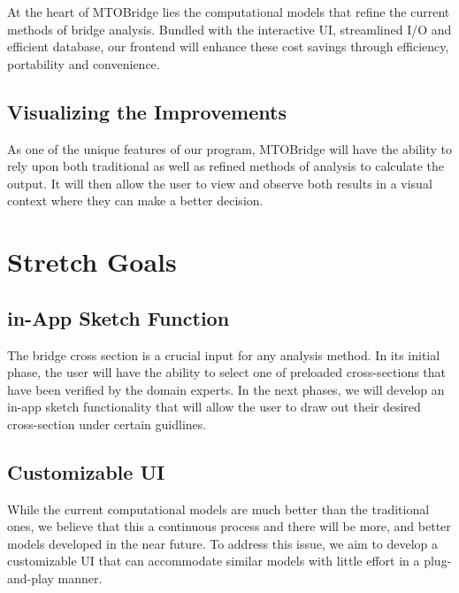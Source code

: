 \documentclass{article}
\begin{document}
At the heart of MTOBridge lies the computational models that refine the current methods of bridge analysis. Bundled with the interactive UI, streamlined I/O and efficient database, our frontend will enhance these cost savings through efficiency, portability and convenience. 

\subsection {Visualizing the Improvements}

As one of the unique features of our program, MTOBridge will have the ability to rely upon both traditional as well as refined methods of analysis to calculate the output. It will then allow the user to view and observe both results in a visual context where they can make a better decision.  

\section{Stretch Goals}

\subsection {in-App Sketch Function}

The bridge cross section is a crucial input for any analysis method. In its initial phase, the user will have the ability to select one of preloaded cross-sections that have been verified by the domain experts. In the next phases, we will develop an in-app sketch functionality that will allow the user to draw out their desired cross-section under certain guidlines. 

\subsection {Customizable UI}

While the current computational models are much better than the traditional ones, we believe that this a continuous process and there will be more, and better models developed in the near future. To address this issue, we aim to develop a customizable UI that can accommodate similar models with little effort in a plug-and-play manner. 
\end{document}
